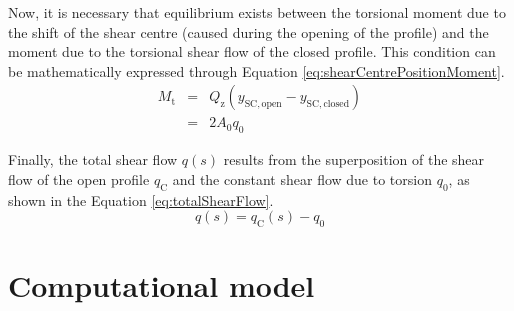 Now, it is necessary that equilibrium exists between the torsional moment due to the shift of the shear centre (caused during the opening of the profile) and the moment due to the torsional shear flow of the closed profile. This condition can be mathematically expressed through Equation \ref{eq:shearCentrePositionMoment}.
%
\begin{eqnarray}\label{eq:shearCentrePositionMoment}
  M_\mathrm{t} &=& Q_\mathrm{z} (y_{\mathrm{SC,open}} - y_{\mathrm{SC,closed}}) \nonumber \\
  &=& 2 A_0 q_0
\end{eqnarray}
%

Finally, the total shear flow $q(s)$ results from the superposition of the shear flow of the open profile $q_\mathrm{C}$ and the constant shear flow due to torsion $q_0$, as shown in the Equation \ref{eq:totalShearFlow}.
%
\begin{equation}\label{eq:totalShearFlow}
  q(s) = q_\mathrm{C}(s) - q_0 %
\end{equation}

\section{Computational model} \label{sec:computationalModel}

% 